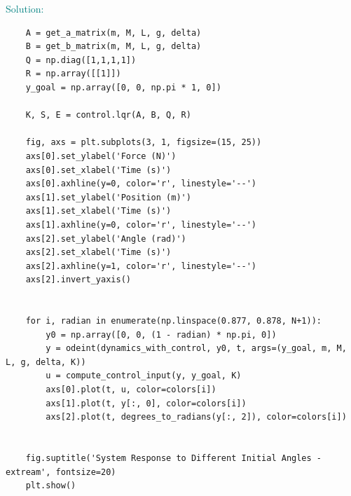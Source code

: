 \documentclass[a4 paper]{article}
\begin{document}
\medbreak

\textcolor{teal}{
    Solution:
}

\begin{verbatim}
    A = get_a_matrix(m, M, L, g, delta)
    B = get_b_matrix(m, M, L, g, delta)
    Q = np.diag([1,1,1,1])
    R = np.array([[1]])
    y_goal = np.array([0, 0, np.pi * 1, 0])

    K, S, E = control.lqr(A, B, Q, R)

    fig, axs = plt.subplots(3, 1, figsize=(15, 25))
    axs[0].set_ylabel('Force (N)')
    axs[0].set_xlabel('Time (s)')
    axs[0].axhline(y=0, color='r', linestyle='--')
    axs[1].set_ylabel('Position (m)')
    axs[1].set_xlabel('Time (s)')
    axs[1].axhline(y=0, color='r', linestyle='--')
    axs[2].set_ylabel('Angle (rad)')
    axs[2].set_xlabel('Time (s)')
    axs[2].axhline(y=1, color='r', linestyle='--')
    axs[2].invert_yaxis()


    for i, radian in enumerate(np.linspace(0.877, 0.878, N+1)):
        y0 = np.array([0, 0, (1 - radian) * np.pi, 0])
        y = odeint(dynamics_with_control, y0, t, args=(y_goal, m, M, L, g, delta, K))
        u = compute_control_input(y, y_goal, K)
        axs[0].plot(t, u, color=colors[i])
        axs[1].plot(t, y[:, 0], color=colors[i])
        axs[2].plot(t, degrees_to_radians(y[:, 2]), color=colors[i])


    fig.suptitle('System Response to Different Initial Angles - extream', fontsize=20)
    plt.show()
\end{verbatim}
\end{document}

